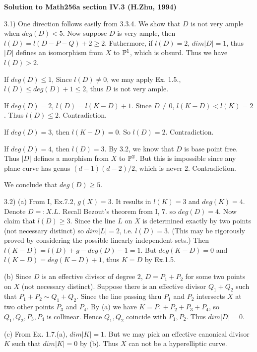 



\newcommand{\pa}{{\Bbb P}^1}
\newcommand{\pp}{{\Bbb P}^2}
\newcommand{\ppp}{{\Bbb P}^n}

{\bf Solution to Math256a section IV.3 (H.Zhu, 1994)}

3.1) One direction follows easily from 3.3.4.  We show that $D$ is not
very ample when $deg(D)<5$. Now suppose $D$ is very ample, then
$l(D)=l(D-P-Q)+2\geq 2$. Futhermore, if $l(D)=2$, $dim|D|=1$, thus
$|D|$ defines an isomorphism from $X$ to $\pa$, which is obsurd. Thus
we have $l(D)>2$.

If $deg(D)\leq 1$, Since $l(D)\not =0$, we may apply Ex. 1.5.,
$l(D)\leq deg(D)+1\leq 2$, thus $D$ is not very ample.

If $deg(D)=2$, $l(D)=l(K-D)+1$. Since $D\not =0$, $l(K-D)<l(K)=2$. Thus
$l(D)\leq 2$. Contradiction.

If $deg(D)=3$, then $l(K-D)=0$. So $l(D)=2$. Contradiction.

If $deg(D)=4$, then $l(D)=3$. By 3.2, we know that $D$ is base point
free. Thus $|D|$ defines a morphism from $X$ to $\pp$. But this is
impossible since any plane curve has genus $(d-1)(d-2)/2$, which is
never 2. Contradiction.

We conclude that $deg(D)\geq 5$.

3.2) (a) From I, Ex.7.2, $g(X)=3$. It results in $l(K)=3$ and
$deg(K)=4$. Denote $D=:X.L$. Recall Bezout's theorem from I, 7. so
$deg(D)=4$. Now claim that $l(D)\geq 3$. Since the line $L$ on $X$ is
determined exactly by two points (not necessary distinct) so $dim
|L|=2$, i.e. $l(D)=3$. (This may be rigorously proved by considering
the possible linearly independent sets.)  Then
$l(K-D)=l(D)+g-deg(D)-1=1$. But $deg(K-D)=0$ and $l(K-D)=deg(K-D)+1$,
thus $K=D$ by Ex.1.5.

(b) Since $D$ is an effective divisor of degree $2$, $D=P_1+P_2$ for
some two points on $X$ (not necessary distinct). Suppose there is an
effective divisor $Q_1+Q_2$ such that $P_1+P_2\sim Q_1+Q_2$. Since the
line passing thru $P_1$ and $P_2$ intersects $X$ at two other points
$P_3$ and $P_4$. By (a) we have $K=P_1+P_2+P_3+P_4$, so $Q_1, Q_2,
P_3, P_4$ is collinear. Hence $Q_1, Q_2$ coincide with $P_1, P_2$.
Thus $dim|D|=0$.

(c) From Ex. 1.7.(a), $dim|K|=1$. But we may pick an effective
canonical divisor $K$ such that $dim|K|=0$ by (b). Thus $X$ can not be
a hyperelliptic curve. 

